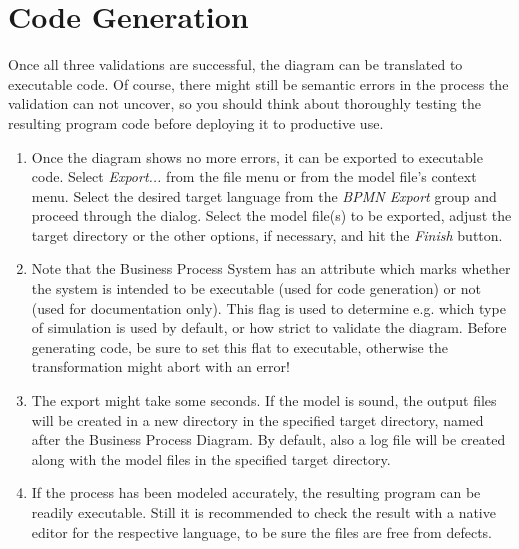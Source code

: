 \section{Code Generation}
\label{sec:user_tut_export}
	
Once all three validations are successful, the diagram can be translated to
executable code.  Of course, there might still be semantic errors in the process
the validation can not uncover, so you should think about thoroughly testing the
resulting program code before deploying it to productive use.
	
\begin{enumerate}

	\item Once the diagram shows no more errors, it can be exported to executable
	code.  Select \emph{Export...} from the file menu or from the model file's
	context menu.  Select the desired target language from the \emph{BPMN Export}
	group and proceed through the dialog.  Select the model file(s) to be exported,
	adjust the target directory or the other options, if necessary, and hit the
	\emph{Finish} button.
	
	\item Note that the Business Process System has an attribute which marks
	whether the system is intended to be executable (used for code generation) or
	not (used for documentation only).  This flag is used to determine e.g. which
	type of simulation is used by default, or how strict to validate the diagram.
	Before generating code, be sure to set this flat to executable, otherwise the
	transformation might abort with an error!
	
	\item The export might take some seconds.  If the model is sound, the output
	files will be created in a new directory in the specified target directory,
	named after the Business Process Diagram.  By default, also a log file will
	be created along with the model files in the specified target directory.
	
	\item If the process has been modeled accurately, the resulting program can
	be readily executable.  Still it is recommended to check the result with a
	native editor for the respective language, to be sure the files are free from
	defects.

\end{enumerate}


